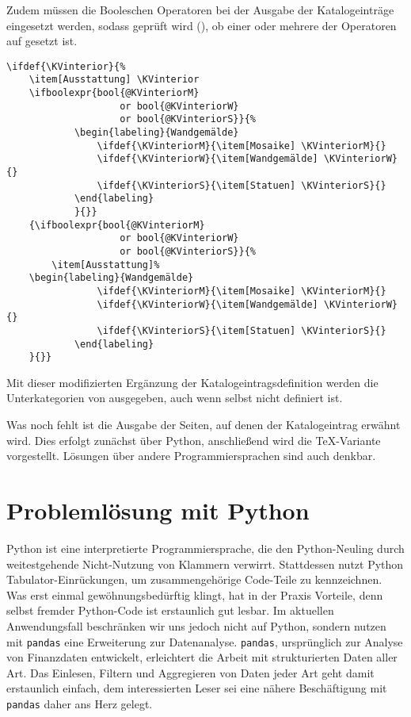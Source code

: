 \documentclass[ngerman]{dtk}
\begin{document}
Zudem müssen die Booleschen Operatoren bei der Ausgabe der Katalogeinträge eingesetzt werden,
sodass geprüft wird (), ob einer oder mehrere der Operatoren auf  gesetzt ist.
\begin{lstlisting}[style=number]
\ifdef{\KVinterior}{%
	\item[Ausstattung] \KVinterior 
	\ifboolexpr{bool{@KVinteriorM} 
					or bool{@KVinteriorW} 
					or bool{@KVinteriorS}}{%
			\begin{labeling}{Wandgemälde}
				\ifdef{\KVinteriorM}{\item[Mosaike] \KVinteriorM}{}
				\ifdef{\KVinteriorW}{\item[Wandgemälde] \KVinteriorW}{}
				\ifdef{\KVinteriorS}{\item[Statuen] \KVinteriorS}{}
			\end{labeling}
			}{}}
	{\ifboolexpr{bool{@KVinteriorM} 
					or bool{@KVinteriorW} 
					or bool{@KVinteriorS}}{%
		\item[Ausstattung]%
	\begin{labeling}{Wandgemälde}	
				\ifdef{\KVinteriorM}{\item[Mosaike] \KVinteriorM}{}
				\ifdef{\KVinteriorW}{\item[Wandgemälde] \KVinteriorW}{}
				\ifdef{\KVinteriorS}{\item[Statuen] \KVinteriorS}{}
			\end{labeling}
	}{}}
\end{lstlisting}
Mit dieser modifizierten Ergänzung der Katalogeintragsdefinition werden die Unterkategorien von  ausgegeben, 
auch wenn  selbst nicht definiert ist.


Was noch fehlt ist die Ausgabe der Seiten, auf denen der Katalogeintrag
 erwähnt wird. 
Dies erfolgt zunächst über Python, 
anschließend wird die \TeX -Variante vorgestellt.
Lösungen über andere Programmiersprachen sind auch denkbar.

\section{Problemlösung mit Python}
Python ist eine interpretierte Programmiersprache, die den Python-Neuling durch weitestgehende Nicht-Nutzung von Klammern verwirrt. 
Stattdessen nutzt Python Tabulator-Einrückungen, 
um zusammengehörige Code-Teile zu kennzeichnen. 
Was erst einmal gewöhnungsbedürftig klingt, 
hat in der Praxis Vorteile, denn selbst fremder Python-Code ist erstaunlich gut lesbar. 
Im aktuellen Anwendungsfall beschränken wir uns jedoch nicht auf Python, 
sondern nutzen mit  \verb|pandas| eine Erweiterung zur Datenanalyse. 
\verb|pandas|, ursprünglich zur Analyse von Finanzdaten entwickelt, 
erleichtert die Arbeit mit strukturierten Daten aller Art. 
Das Einlesen, Filtern und Aggregieren von Daten jeder Art geht damit erstaunlich einfach, 
dem interessierten Leser sei eine nähere Beschäftigung mit \verb|pandas| daher ans Herz gelegt.
\end{document}
